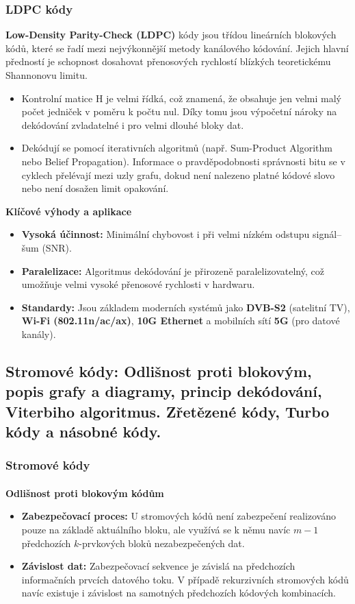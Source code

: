     \subsubsection{LDPC kódy}
        \textbf{Low-Density Parity-Check (LDPC)} kódy jsou třídou lineárních blokových kódů, které se řadí mezi nejvýkonnější metody kanálového kódování. Jejich hlavní předností je schopnost dosahovat přenosových rychlostí blízkých teoretickému Shannonovu limitu.
        \begin{itemize}
            \item Kontrolní matice H je velmi řídká, což znamená, že obsahuje jen velmi malý počet jedniček v poměru k počtu nul. Díky tomu jsou výpočetní nároky na dekódování zvladatelné i pro velmi dlouhé bloky dat.
            \item Dekódují se pomocí iterativních algoritmů (např. Sum-Product Algorithm nebo Belief Propagation). Informace o pravděpodobnosti správnosti bitu se v cyklech přelévají mezi uzly grafu, dokud není nalezeno platné kódové slovo nebo není dosažen limit opakování.
        \end{itemize}
        \textbf{Klíčové výhody a aplikace}
            \begin{itemize}
                \item \textbf{Vysoká účinnost:} Minimální chybovost i při velmi nízkém odstupu signál--šum (SNR).
                \item \textbf{Paralelizace:} Algoritmus dekódování je přirozeně paralelizovatelný, což umožňuje velmi vysoké přenosové rychlosti v hardwaru.
                \item \textbf{Standardy:} Jsou základem moderních systémů jako \textbf{DVB-S2} (satelitní TV), \textbf{Wi-Fi (802.11n/ac/ax)}, \textbf{10G Ethernet} a mobilních sítí \textbf{5G} (pro datové kanály).
            \end{itemize}
\subsection{Stromové kódy: Odlišnost proti blokovým, popis grafy a diagramy, princip dekódování, Viterbiho algoritmus. Zřetězené kódy, Turbo kódy a násobné kódy.}
    \subsubsection{Stromové kódy}
        \paragraph{}
        \textbf{Odlišnost proti blokovým kódům}
        \begin{itemize}
            \item \textbf{Zabezpečovací proces:} U stromových kódů není zabezpečení realizováno pouze na základě aktuálního bloku, ale využívá se k němu navíc $m - 1$ předchozích $k$-prvkových bloků nezabezpečených dat.
            \item \textbf{Závislost dat:} Zabezpečovací sekvence je závislá na předchozích informačních prvcích datového toku. V případě rekurzivních stromových kódů navíc existuje i závislost na samotných předchozích kódových kombinacích.
        \end{itemize}
